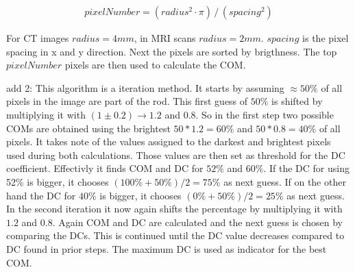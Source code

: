 \begin{align}
 pixelNumber = (radius^2 \cdot \pi) \, / \, (spacing^2)
\end{align}

For CT images $radius = 4mm$, in MRI scans $radius = 2mm$. $spacing$ is the pixel spacing in x and y direction.
Next the pixels are sorted by brigthness. The top $pixelNumber$ pixels are then used to calculate the COM.

add 2:
This algorithm is a iteration method. It starts by assuming $\approx 50\%$ of all pixels in the image are part of the rod.
This first guess of $50\%$ is shifted by multiplying it with $(1 \pm 0.2) \rightarrow 1.2$ and $0.8$.
So in the first step two possible COMs are obtained using the brightest $50*1.2 = 60\%$ and $50*0.8 = 40\%$ of all pixels.
It takes note of the values assigned to the darkest and brightest pixels used during both calculations.
Those values are then set as threshold for the DC coefficient.
Effectivly it finds COM and DC for $52\%$ and $60\%$. If the DC for using 52\% is bigger, it chooses $(100\% + 50\%) / 2 = 75\%$ as next guess.
If on the other hand the DC for $40\%$ is bigger, it chooses $(0\% + 50\%) / 2 = 25\%$ as next guess.
In the second iteration it now again shifts the percentage by multiplying it with $1.2$ and $0.8$. Again COM and DC are calculated and the next guess is chosen by comparing the DCs.
This is continued until the DC value decreases compared to DC found in prior steps. The maximum DC is used as indicator for the best COM.

